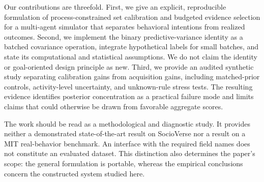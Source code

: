 Our contributions are threefold. First, we give an explicit, reproducible formulation of process-constrained set calibration and budgeted evidence selection for a multi-agent simulator that separates behavioral intentions from realized outcomes. Second, we implement the binary predictive-variance identity as a batched covariance operation, integrate hypothetical labels for small batches, and state its computational and statistical assumptions. We do not claim the identity or goal-oriented design principle as new. Third, we provide an audited synthetic study separating calibration gains from acquisition gains, including matched-prior controls, activity-level uncertainty, and unknown-rule stress tests. The resulting evidence identifies posterior concentration as a practical failure mode and limits claims that could otherwise be drawn from favorable aggregate scores.

The work should be read as a methodological and diagnostic study. It provides neither a demonstrated state-of-the-art result on SocioVerse nor a result on a MIT real-behavior benchmark. An interface with the required field names does not constitute an evaluated dataset. This distinction also determines the paper's scope: the general formulation is portable, whereas the empirical conclusions concern the constructed system studied here.
